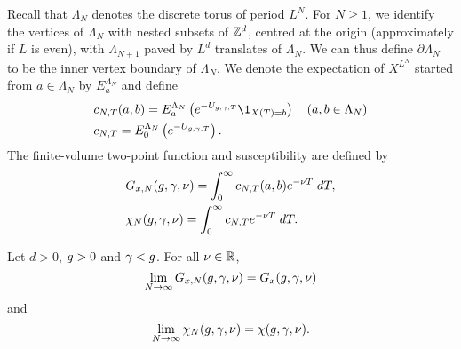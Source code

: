 Recall that $\Lambda_N$ denotes the discrete torus of period $L^N$. %
For $N \ge 1$, we identify the vertices of $\Lambda_N$ with nested subsets of ${ {{\mathbb Z}}^d }$,
centred at the origin (approximately if $L$ is even),
with $\Lambda_{N+1}$ paved by $L^d$ translates of $\Lambda_N$.
We can thus define $\partial \Lambda_N$ to be the inner vertex boundary of $\Lambda_N$.
We denote the expectation of $X^{L^N}$ started from $a \in \Lambda_N$ by $E^{\Lambda_N}_a$
and define
\begin{align}
\label{e:cN}
&c_{N,T}(a, b)
    = E^{\Lambda_N}_a \left( e^{-U_{\gcc,\gamma,T}} \1_{X(T)=b} \right)
    \quad (a, b \in \Lambda_N) \\
&c_{N,T}
    = E^{\Lambda_N}_0 \left( e^{-U_{\gcc,\gamma,T}} \right).
\end{align}
The finite-volume two-point function and susceptibility
are defined by
\begin{align}
&G_{x,N}(g, \gamma, \nu)
    = \int_0^\infty c_{N,T}(a, b) e^{-\nu T} \; dT, \\
&\chi_N(g, \gamma, \nu)
    = \int_0^\infty c_{N,T} e^{-\nu T} \; dT
    .
    \label{e:chiNdef}
\end{align}

\begin{prop}
\label{prop:finvol}
Let $d >0$, $g >0$ and $\gamma < g$. For all $\nu \in {\mathbb R}$,
\begin{equation}
\label{e:Givlc}
\lim_{N \rightarrow \infty}
G_{x,N}(g, \gamma, \nu)
=
G_x(g, \gamma, \nu)
\end{equation}
and
\begin{equation}
\label{e:chilim}
\lim_{N\rightarrow\infty}\chi_N(g,\gamma,\nu)=   \chi(g,\gamma,\nu).
\end{equation}
\end{prop}

